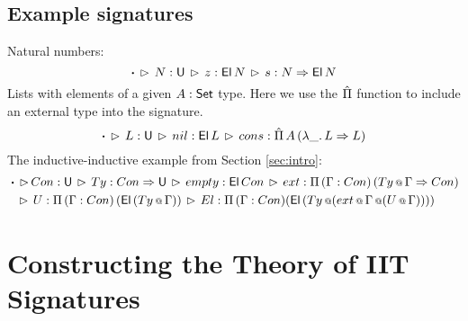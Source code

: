 \documentclass[a4paper,UKenglish,cleveref, autoref]{lipics-v2019}
\begin{document}
\subsection{Example signatures}

Natural numbers:
\[
\boldsymbol{\cdot}\,\rhd\,N:\mathsf{U}\,\rhd\,z : \mathsf{El}\,N\,\rhd\,s : N \Rightarrow \mathsf{El}\,N
\]
Lists with elements of a given $A : \mathsf{Set}$ type. Here we use the $\hat{\Pi}$ function
to include an external type into the signature.
\[
\boldsymbol{\cdot}\,\rhd\,L:\mathsf{U}\,\rhd\,nil : \mathsf{El}\,L\,\rhd\,
      cons : \hat{\Pi}\,A\,(\lambda \_.\, L\Rightarrow L)
\]
The inductive-inductive example from Section \ref{sec:intro}:
\begin{alignat*}{3}
  & \boldsymbol{\cdot} \,\rhd\,Con : \mathsf{U}\,\rhd\,Ty : Con\Rightarrow\mathsf{U}\,\rhd\,empty : \mathsf{El}\,Con\,\rhd\,ext : \Pi\,(\Gamma : Con)\,(Ty\mathop{{\scriptstyle @}}\Gamma \Rightarrow Con) \\
  & \hspace{0.5em}\,\rhd\, U : \Pi\,(\Gamma:Con)\,(\mathsf{El}\,(Ty\mathop{{\scriptstyle @}}\Gamma))
    \,\rhd\,El : \Pi\,(\Gamma : Con)(\mathsf{El}\,(Ty\mathop{{\scriptstyle @}}(ext\mathop{{\scriptstyle @}}\Gamma\mathop{{\scriptstyle @}} (U\mathop{{\scriptstyle @}}\Gamma))))
\end{alignat*}

\section{Constructing the Theory of IIT Signatures}
\label{sec:ambroise}





\end{document}
